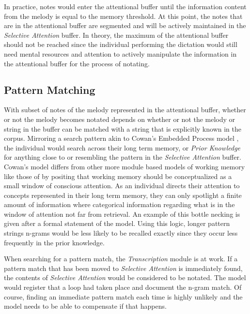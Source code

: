 \documentclass[]{book}
\begin{document}
In practice, notes would enter the attentional buffer until the information content from the melody is equal to the memory threshold.
At this point, the notes that are in the attentional buffer are segmented and will be actively maintained in the \emph{Selective Attention} buffer.
In theory, the maximum of the attentional buffer should not be reached since the individual performing the dictation would still need mental resources and attention to actively manipulate the information in the attentional buffer for the process of notating.

\hypertarget{pattern-matching}{%
\subsection{Pattern Matching}\label{pattern-matching}}

With subset of notes of the melody represented in the attentional buffer, whether or not the melody becomes notated depends on whether or not the melody or string in the buffer can be matched with a string that is explicitly known in the corpus.
Mirroring a search pattern akin to Cowan's Embedded Process model \citep{cowanEvolvingConceptionsMemory1988, cowanMagicalMysteryFour2010}, the individual would search across their long term memory, or \emph{Prior Knowledge} for anything close to or resembling the pattern in the \emph{Selective Attention} buffer.
Cowan's model differs from other more module based models of working memory like those of \citet{baddeleyWorkingMemory1974} by positing that working memory should be conceptualized as a small window of conscious attention.
As an individual directs their attention to concepts represented in their long term memory, they can only spotlight a finite amount of information where categorical information regarding what is in the window of attention not far from retrieval.
An example of this bottle necking is given after a formal statement of the model.
Using this logic, longer pattern strings n-grams would be less likely to be recalled exactly since they occur less frequently in the prior knowledge.

When searching for a pattern match, the \emph{Transcription} module is at work.
If a pattern match that has been moved to \emph{Selective Attention} is immediately found, the contents of \emph{Selective Attention} would be considered to be notated.
The model would register that a loop had taken place and document the n-gram match.
Of course, finding an immediate pattern match each time is highly unlikely and the model needs to be able to compensate if that happens.
\end{document}
